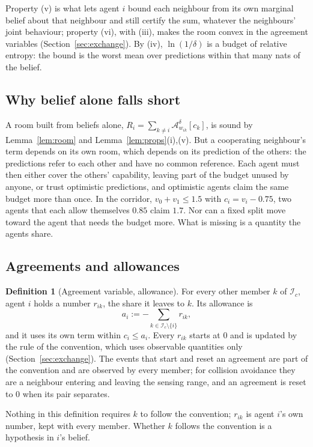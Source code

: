 \documentclass[11pt]{article}
\theoremstyle{definition}
\newtheorem{definition}[theorem]{Definition}
\theoremstyle{remark}
\newcommand{\A}{\mathcal{A}}
\newcommand{\I}{\mathcal{I}}
\begin{document}
Property (v) is what lets agent $i$ bound each neighbour from its own marginal belief about that neighbour and still certify the sum, whatever the neighbours' joint behaviour; property (vi), with (iii), makes the room convex in the agreement variables (Section~\ref{sec:exchange}). By (iv), $\ln(1/\delta)$ is a budget of relative entropy: the bound is the worst mean over predictions within that many nats of the belief.

\subsection{Why belief alone falls short}
A room built from beliefs alone, $R_i=\sum_{k\ne i}\A^\delta_{w_{ik}}[c_k]$, is sound by Lemma~\ref{lem:room} and Lemma~\ref{lem:props}(i),(v). But a cooperating neighbour's term depends on its own room, which depends on its prediction of the others: the predictions refer to each other and have no common reference. Each agent must then either cover the others' capability, leaving part of the budget unused by anyone, or trust optimistic predictions, and optimistic agents claim the same budget more than once. In the corridor, $v_0+v_1\le1.5$ with $c_i=v_i-0.75$, two agents that each allow themselves $0.85$ claim $1.7$. Nor can a fixed split move toward the agent that needs the budget more. What is missing is a quantity the agents share.

\subsection{Agreements and allowances}
\begin{definition}[Agreement variable, allowance]\label{def:agreement}
For every other member $k$ of $\I_c$, agent $i$ holds a number $r_{ik}$, the share it leaves to $k$. Its allowance is
\[
a_i:=-\sum_{k\in\I_c\setminus\{i\}}r_{ik},
\]
and it uses its own term within $c_i\le a_i$. Every $r_{ik}$ starts at $0$ and is updated by the rule of the convention, which uses observable quantities only (Section~\ref{sec:exchange}). The events that start and reset an agreement are part of the convention and are observed by every member; for collision avoidance they are a neighbour entering and leaving the sensing range, and an agreement is reset to $0$ when its pair separates.
\end{definition}

Nothing in this definition requires $k$ to follow the convention; $r_{ik}$ is agent $i$'s own number, kept with every member. Whether $k$ follows the convention is a hypothesis in $i$'s belief.
\end{document}
